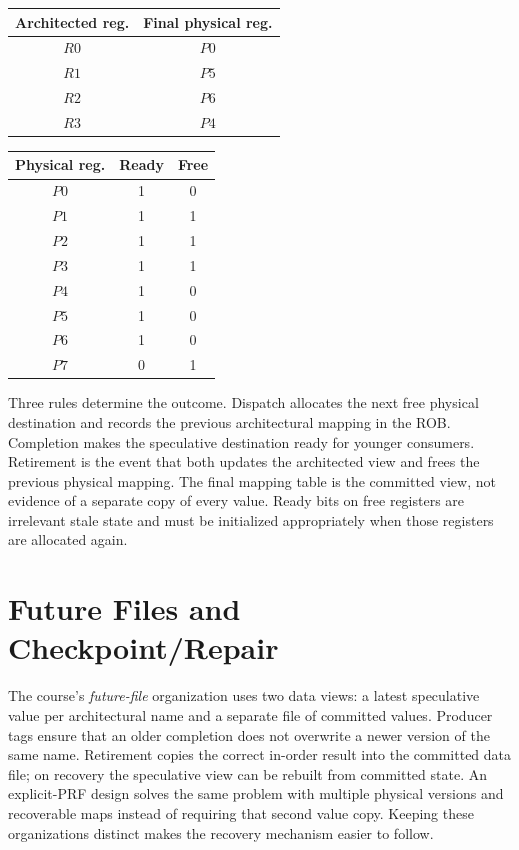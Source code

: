 {\begin{center}
    \begin{tabular}{|c|c|}
        \hline
        Architected reg.
        & Final physical reg. \\
        \hline
        $R0$             & $P0$                \\
        \hline
        $R1$             & $P5$                \\
        \hline
        $R2$             & $P6$                \\
        \hline
        $R3$             & $P4$                \\
        \hline
    \end{tabular}
    \hspace{1.5em}
    \begin{tabular}{|c|c|c|}
        \hline
        Physical reg.
        & Ready & Free \\
        \hline
        $P0$          & 1     & 0    \\
        \hline
        $P1$          & 1     & 1    \\
        \hline
        $P2$          & 1     & 1    \\
        \hline
        $P3$          & 1     & 1    \\
        \hline
        $P4$          & 1     & 0    \\
        \hline
        $P5$          & 1     & 0    \\
        \hline
        $P6$          & 1     & 0    \\
        \hline
        $P7$          & 0     & 1    \\
        \hline
    \end{tabular}
\end{center}}

Three rules determine the outcome.
Dispatch allocates the next free physical destination and records the previous architectural mapping in the ROB\@.
Completion makes the speculative destination ready for younger consumers.
Retirement is the event that both updates the architected view and frees the previous physical mapping.
The final mapping table is the committed view, not evidence of a separate copy of every value.
Ready bits on free registers are irrelevant stale state and must be initialized appropriately when those registers are allocated again.


\section{Future Files and Checkpoint/Repair}\label{sec:ilp-future-file-checkpoint}
The course's \textit{future-file} organization uses two data views: a latest speculative value per architectural name and a separate file of committed values.
Producer tags ensure that an older completion does not overwrite a newer version of the same name.
Retirement copies the correct in-order result into the committed data file; on recovery the speculative view can be rebuilt from committed state.
An explicit-PRF design solves the same problem with multiple physical versions and recoverable maps instead of requiring that second value copy.
Keeping these organizations distinct makes the recovery mechanism easier to follow.


